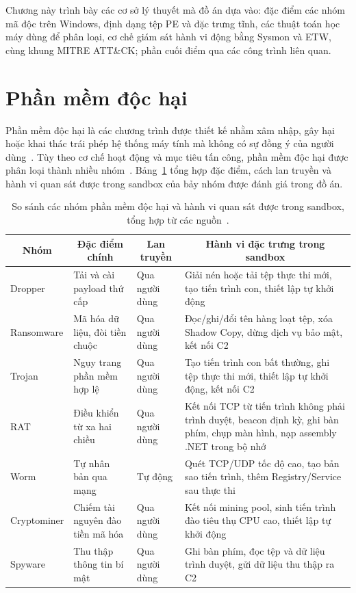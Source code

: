 \documentclass[../DoAn.tex]{subfiles}
\begin{document}
Chương này trình bày các cơ sở lý thuyết mà đồ án dựa vào: đặc điểm
các nhóm mã độc trên Windows, định dạng tệp PE và đặc trưng tĩnh, các
thuật toán học máy dùng để phân loại, cơ chế giám sát hành vi động bằng
Sysmon và ETW, cùng khung MITRE ATT\&CK; phần cuối điểm qua các công
trình liên quan.

\section{Phần mềm độc hại}
\label{section:2.1}

Phần mềm độc hại là các chương trình được thiết kế nhằm xâm nhập, 
gây hại hoặc khai thác trái phép hệ thống máy tính mà không có sự 
đồng ý của người dùng~\cite{ye2017}. Tùy theo cơ chế hoạt động và 
mục tiêu tấn công, phần mềm độc hại được phân loại thành nhiều nhóm~\cite{gibert2020}. Bảng~\ref{tab:malware_comparison} tổng hợp đặc điểm, cách lan truyền
và hành vi quan sát được trong sandbox của bảy nhóm được đánh giá
trong đồ án.
\begin{table}[H]
\centering
\caption{So sánh các nhóm phần mềm độc hại và hành vi quan sát được
  trong sandbox, tổng hợp từ các
  nguồn~\cite{ye2017,gibert2020,DBLP:journals/corr/abs-2102-06249,7958609,rezaeirad2018,rashid2024,Zou2006,porras2009}.}
\label{tab:malware_comparison}
\begin{tabular}{|l|p{3cm}|p{2.6cm}|p{5.5cm}|}
\hline
\multicolumn{1}{|c|}{\textbf{Nhóm}} & \multicolumn{1}{c|}{\textbf{Đặc điểm chính}} & \multicolumn{1}{c|}{\textbf{Lan truyền}} & \multicolumn{1}{c|}{\textbf{Hành vi đặc trưng trong sandbox}} \\
\hline
Dropper & Tải và cài payload thứ cấp & Qua người dùng & Giải nén hoặc tải tệp thực thi mới, tạo tiến trình con, thiết lập tự khởi động \\
\hline
Ransomware & Mã hóa dữ liệu, đòi tiền chuộc & Qua người dùng & Đọc/ghi/đổi tên hàng loạt tệp, xóa Shadow Copy, dừng dịch vụ bảo mật, kết nối C2 \\
\hline
Trojan & Ngụy trang phần mềm hợp lệ & Qua người dùng & Tạo tiến trình con bất thường, ghi tệp thực thi mới, thiết lập tự khởi động, kết nối C2 \\
\hline
RAT & Điều khiển từ xa hai chiều & Qua người dùng & Kết nối TCP từ tiến trình không phải trình duyệt, beacon định kỳ, ghi bàn phím, chụp màn hình, nạp assembly .NET trong bộ nhớ \\
\hline
Worm & Tự nhân bản qua mạng & Tự động & Quét TCP/UDP tốc độ cao, tạo bản sao tiến trình, thêm Registry/Service sau thực thi \\
\hline
Cryptominer & Chiếm tài nguyên đào tiền mã hóa & Qua người dùng & Kết nối mining pool, sinh tiến trình đào tiêu thụ CPU cao, thiết lập tự khởi động \\
\hline
Spyware & Thu thập thông tin bí mật & Qua người dùng & Ghi bàn phím, đọc tệp và dữ liệu trình duyệt, gửi dữ liệu thu thập ra C2 \\
\hline
\end{tabular}
\end{table}
\end{document}
